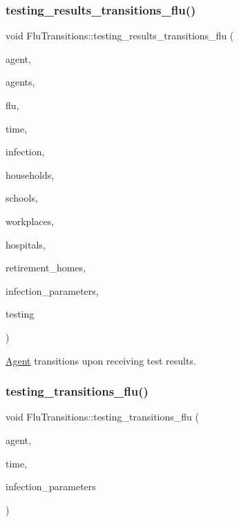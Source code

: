 \subsubsection{\texorpdfstring{testing\+\_\+results\+\_\+transitions\+\_\+flu()}{testing\_results\_transitions\_flu()}}
{\footnotesize\ttfamily void Flu\+Transitions\+::testing\+\_\+results\+\_\+transitions\+\_\+flu (\begin{DoxyParamCaption}\item[{\hyperlink{classAgent}{Agent} \&}]{agent,  }\item[{std\+::vector$<$ \hyperlink{classAgent}{Agent} $>$ \&}]{agents,  }\item[{\hyperlink{classFlu}{Flu} \&}]{flu,  }\item[{const double}]{time,  }\item[{\hyperlink{classInfection}{Infection} \&}]{infection,  }\item[{std\+::vector$<$ \hyperlink{classHousehold}{Household} $>$ \&}]{households,  }\item[{std\+::vector$<$ \hyperlink{classSchool}{School} $>$ \&}]{schools,  }\item[{std\+::vector$<$ \hyperlink{classWorkplace}{Workplace} $>$ \&}]{workplaces,  }\item[{std\+::vector$<$ \hyperlink{classHospital}{Hospital} $>$ \&}]{hospitals,  }\item[{std\+::vector$<$ \hyperlink{classRetirementHome}{Retirement\+Home} $>$ \&}]{retirement\+\_\+homes,  }\item[{const std\+::map$<$ std\+::string, double $>$ \&}]{infection\+\_\+parameters,  }\item[{const \hyperlink{classTesting}{Testing} \&}]{testing }\end{DoxyParamCaption})}



\hyperlink{classAgent}{Agent} transitions upon receiving test results. 

\mbox{\label{classFluTransitions_ab534b1ee19eaabccef0901ce5bef718f}} 
\subsubsection{\texorpdfstring{testing\+\_\+transitions\+\_\+flu()}{testing\_transitions\_flu()}}
{\footnotesize\ttfamily void Flu\+Transitions\+::testing\+\_\+transitions\+\_\+flu (\begin{DoxyParamCaption}\item[{\hyperlink{classAgent}{Agent} \&}]{agent,  }\item[{const double}]{time,  }\item[{const std\+::map$<$ std\+::string, double $>$ \&}]{infection\+\_\+parameters }\end{DoxyParamCaption})}



